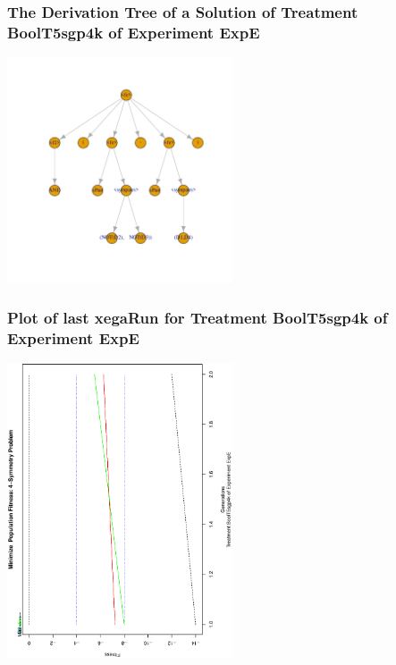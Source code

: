 \documentclass[18pt,c]{beamer}
\begin{document}
 \begin{frame}
 \frametitle{ The Derivation Tree of a Solution of Treatment BoolT5sgp4k of Experiment ExpE }
 \begin{center}
\includegraphics[width=0.5\textwidth, angle=0]
{ExpEDerivationTreeFigure007.pdf}
 \end{center}
 \label{report/ExpEDerivationTreeFigure007.pdf}  
 \end{frame}

 \begin{frame}
 \frametitle{ Plot of last xegaRun for Treatment BoolT5sgp4k of Experiment ExpE }
 \begin{center}
\includegraphics[width=0.5\textwidth, angle=-90]
{ExpEPlotPopStatsFigure007.eps}
 \end{center}
 \label{report/ExpEPlotPopStatsFigure007.eps}  
 \end{frame}
\end{document}
